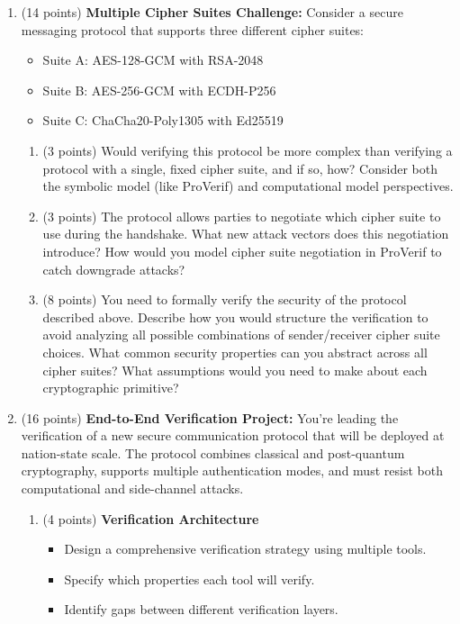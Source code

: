 \documentclass[10pt,a4paper,american]{article}
\begin{document}
\begin{enumerate}
	\item (14 points) \textbf{Multiple Cipher Suites Challenge:}
	      Consider a secure messaging protocol that supports three different cipher suites:
	      \begin{itemize}
		      \item Suite A: AES-128-GCM with RSA-2048
		      \item Suite B: AES-256-GCM with ECDH-P256
		      \item Suite C: ChaCha20-Poly1305 with Ed25519
	      \end{itemize}

	      \begin{enumerate}
		      \item (3 points) Would verifying this protocol be more complex than verifying a protocol with a single, fixed cipher suite, and if so, how? Consider both the symbolic model (like ProVerif) and computational model perspectives.
		      \item (3 points) The protocol allows parties to negotiate which cipher suite to use during the handshake. What new attack vectors does this negotiation introduce? How would you model cipher suite negotiation in ProVerif to catch downgrade attacks?
		      \item (8 points) You need to formally verify the security of the protocol described above. Describe how you would structure the verification to avoid analyzing all possible combinations of sender/receiver cipher suite choices. What common security properties can you abstract across all cipher suites? What assumptions would you need to make about each cryptographic primitive?
	      \end{enumerate}

	\item (16 points) \textbf{End-to-End Verification Project:}
	      You're leading the verification of a new secure communication protocol that will be deployed at nation-state scale. The protocol combines classical and post-quantum cryptography, supports multiple authentication modes, and must resist both computational and side-channel attacks.
	      \begin{enumerate} \item (4 points) \textbf{Verification Architecture}
		            \begin{itemize}
			            \item Design a comprehensive verification strategy using multiple tools.
			            \item Specify which properties each tool will verify.
			            \item Identify gaps between different verification layers.
		            \end{itemize}


\end{enumerate}
\end{enumerate}
\end{document}
